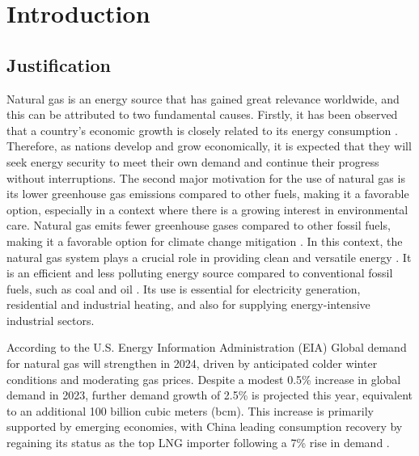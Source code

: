 \chapter{Introduction} \label{cap:introduccion}

\section{Justification}

Natural gas is an energy source that has gained great relevance worldwide, and this can be attributed to two fundamental causes. Firstly, it has been observed that a country's economic growth is closely related to its energy consumption \cite{Alam_M}. Therefore, as nations develop and grow economically, it is expected that they will seek energy security to meet their own demand and continue their progress without interruptions. The second major motivation for the use of natural gas is its lower greenhouse gas emissions compared to other fuels, making it a favorable option, especially in a context where there is a growing interest in environmental care. Natural gas emits fewer greenhouse gases compared to other fossil fuels, making it a favorable option for climate change mitigation \cite{china_natural_gas}. In this context, the natural gas system plays a crucial role in providing clean and versatile energy \cite{Yin_Wen_Wu_Han_Mukhtar_Gong_2022}. It is an efficient and less polluting energy source compared to conventional fossil fuels, such as coal and oil \cite{Aydin_2018}. Its use is essential for electricity generation, residential and industrial heating, and also for supplying energy-intensive industrial sectors.

According to the U.S. Energy Information Administration (EIA) Global demand for natural gas will strengthen in 2024, driven by anticipated colder winter conditions and moderating gas prices. Despite a modest 0.5\% increase in global demand in 2023, further demand growth of 2.5\% is projected this year, equivalent to an additional 100 billion cubic meters (bcm). This increase is primarily supported by emerging economies, with China leading consumption recovery by regaining its status as the top LNG importer following a 7\% rise in demand \cite{IEA_2024}. 




